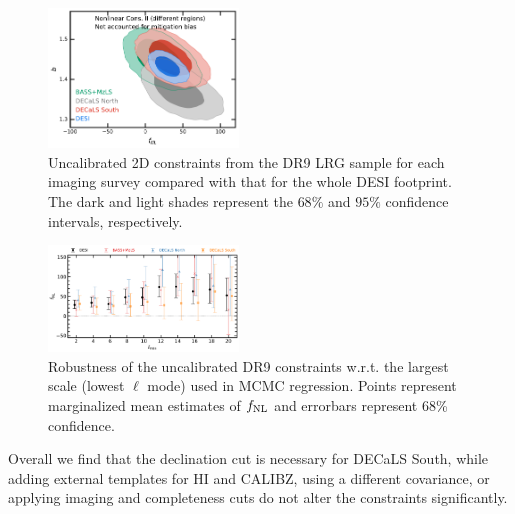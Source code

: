 \begin{figure}
    \centering
    \includegraphics[width=0.45\textwidth]{figures/mcmc_dr9regions.pdf} 
    \caption{Uncalibrated 2D constraints from the DR9 LRG sample for each imaging survey compared with that for the whole DESI footprint. The dark and light shades represent the $68\%$ and $95\%$ confidence intervals, respectively.}\label{fig:mcmc_dr9reg}
\end{figure}

\begin{figure}
    \centering
    \includegraphics[width=0.45\textwidth]{figures/fnl_elmin.pdf}     
    \caption{Robustness of the uncalibrated DR9 constraints w.r.t. the largest scale (lowest $\ell$ mode) used in MCMC regression. Points represent marginalized mean estimates of $f_{\rm NL}$ and errorbars represent $68$\% confidence.}\label{fig:mcmc_dr9elmin}
\end{figure}


Overall we find that the declination cut is necessary for DECaLS South, while adding external templates for HI and CALIBZ, using a different covariance, or applying imaging and completeness cuts do not alter the constraints significantly.